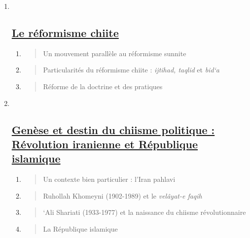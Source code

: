 \begin{enumerate}
\def\labelenumi{\Roman{enumi}.}
\item ~
  \hypertarget{le-ruxe9formisme-chiite}{%
  \subsection{\texorpdfstring{\underline{Le réformisme
  chiite}}{Le réformisme chiite}}\label{le-ruxe9formisme-chiite}}

  \begin{enumerate}
  \def\labelenumii{\arabic{enumii}.}
  \item
    \begin{quote}
    Un mouvement parallèle au réformisme sunnite
    \end{quote}
  \item
    \begin{quote}
    Particularités du réformisme chiite : \emph{ijtihad, taqlid} et
    \emph{bid`a}
    \end{quote}
  \item
    \begin{quote}
    Réforme de la doctrine et des pratiques
    \end{quote}
  \end{enumerate}
\item ~
  \hypertarget{genuxe8se-et-destin-du-chiisme-politique-ruxe9volution-iranienne-et-ruxe9publique-islamique}{%
  \subsection{\texorpdfstring{\underline{Genèse et destin du chiisme
  politique : Révolution iranienne et République
  islamique}}{Genèse et destin du chiisme politique : Révolution iranienne et République islamique}}\label{genuxe8se-et-destin-du-chiisme-politique-ruxe9volution-iranienne-et-ruxe9publique-islamique}}

  \begin{enumerate}
  \def\labelenumii{\arabic{enumii}.}
  \item
    \begin{quote}
    Un contexte bien particulier : l'Iran pahlavi
    \end{quote}
  \item
    \begin{quote}
    Ruhollah Khomeyni (1902-1989) et le \emph{velâyat-e faqih}
    \end{quote}
  \item
    \begin{quote}
    `Ali Shariati (1933-1977) et la naissance du chiisme révolutionnaire
    \end{quote}
  \item
    \begin{quote}
    La République islamique
    \end{quote}
  \end{enumerate}
\end{enumerate}

